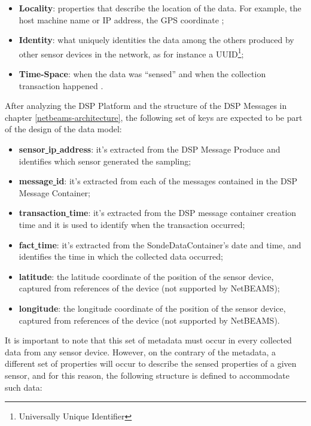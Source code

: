 \begin{itemize}
  \item \textbf{Locality}: properties that describe the location of the data.
  For example, the host machine name or IP address, the GPS coordinate
  \cite{gps};
  \item \textbf{Identity}: what uniquely identities the data among the others
  produced by other sensor devices in the network, as for instance a
  UUID\footnote{Universally Unique Identifier};
  \item \textbf{Time-Space}: when the data was ``sensed'' \cite{db-provenance}
  and when the collection transaction happened \cite{sn-time-series}.
\end{itemize}

After analyzing the DSP Platform and the structure of the DSP Messages in
chapter \ref{netbeams-architecture}, the following set of keys are expected to
be part of the design of the data model:

\begin{itemize}
  \item \textbf{sensor\underline{ }ip\underline{ }address}: it's extracted from
  the DSP Message Produce and identifies which sensor generated the sampling;
  \item \textbf{message\underline{ }id}: it's extracted from each of the messages contained
  in the DSP Message Container;
  \item \textbf{transaction\underline{ }time}: it's extracted from the DSP message container
  creation time and it is used to identify when the transaction occurred;
  \item \textbf{fact\underline{ }time}: it's extracted from the SondeDataContainer's date
  and time, and identifies the time in which the collected data occurred;
  \item \textbf{latitude}: the latitude coordinate of the position of
  the sensor device, captured from references of the device (not supported by
  NetBEAMS);
  \item \textbf{longitude}: the longitude coordinate of the position of the
  sensor device, captured from references of the device (not supported by
  NetBEAMS).
\end{itemize}

It is important to note that this set of metadata must occur in every
collected data from any sensor device. However, on the contrary of the
metadata, a different set of properties will occur to describe the sensed
properties of a given sensor, and for this reason, the following structure is
defined to accommodate such data:


